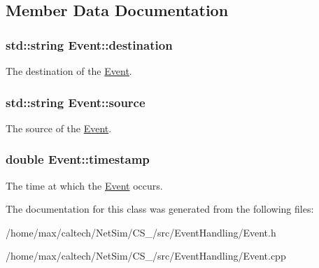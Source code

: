 \subsection{\-Member \-Data \-Documentation}
\hypertarget{classEvent_aa28be1a89b2516ea9f570ff619f754bc}{
\subsubsection[{destination}]{\setlength{\rightskip}{0pt plus 5cm}std\-::string {\bf \-Event\-::destination}}}\label{classEvent_aa28be1a89b2516ea9f570ff619f754bc}


\-The destination of the \hyperlink{classEvent}{\-Event}. 

\hypertarget{classEvent_abc9c246c173d3433d2ffc0a4ed35bc01}{
\subsubsection[{source}]{\setlength{\rightskip}{0pt plus 5cm}std\-::string {\bf \-Event\-::source}}}\label{classEvent_abc9c246c173d3433d2ffc0a4ed35bc01}


\-The source of the \hyperlink{classEvent}{\-Event}. 

\hypertarget{classEvent_abf947fd0c5db2bf468373ee94ec190b4}{
\subsubsection[{timestamp}]{\setlength{\rightskip}{0pt plus 5cm}double {\bf \-Event\-::timestamp}}}\label{classEvent_abf947fd0c5db2bf468373ee94ec190b4}


\-The time at which the \hyperlink{classEvent}{\-Event} occurs. 



\-The documentation for this class was generated from the following files\-:\begin{DoxyCompactItemize}
\item 
/home/max/caltech/\-Net\-Sim/\-C\-S\-\_/src/\-Event\-Handling/\-Event.\-h\item 
/home/max/caltech/\-Net\-Sim/\-C\-S\-\_/src/\-Event\-Handling/\-Event.\-cpp\end{DoxyCompactItemize}
